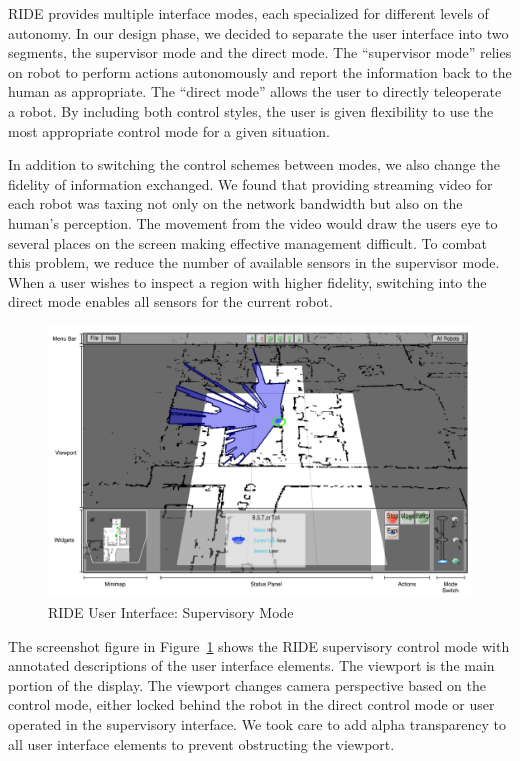 RIDE provides multiple interface modes, each specialized for different levels of autonomy. In our design phase, we decided to separate the user interface into two segments, the supervisor mode and the direct mode. The ``supervisor mode'' relies on robot to perform actions autonomously and report the information back to the human as appropriate. The ``direct mode'' allows the user to directly teleoperate a robot. By including both control styles, the user is given flexibility to use the most appropriate control mode for a given situation.

In addition to switching the control schemes between modes, we also change the fidelity of information exchanged. We found that providing streaming video for each robot was taxing not only on the network bandwidth but also on the human's perception. The movement from the video would draw the users eye to several places on the screen making effective management difficult. To combat this problem, we reduce the number of available sensors in the supervisor mode. When a user wishes to inspect a region with higher fidelity, switching into the direct mode enables all sensors for the current robot.

\begin{figure}[ht]
\begin{center}
\includegraphics[width=6.10in]{images/ride-ui.pdf}
\caption{RIDE User Interface: Supervisory Mode\label{fig:ride-ui}}
\end{center}
\end{figure}

The screenshot figure in Figure~\ref{fig:ride-ui} shows the RIDE supervisory control mode with annotated descriptions of the user interface elements. The viewport is the main portion of the display. The viewport changes camera perspective based on the control mode, either locked behind the robot in the direct control mode or user operated in the supervisory interface. We took care to add alpha transparency to all user interface elements to prevent obstructing the viewport.

